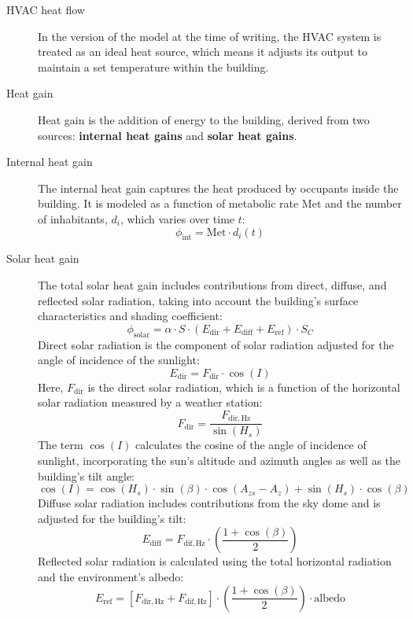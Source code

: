 \documentclass[runningheads]{llncs}
\begin{document}
\begin{description}
  \item[HVAC heat flow] In the version of the model at the time of writing, the HVAC system is treated as an ideal heat source, which means it adjusts its output to maintain a set temperature within the building.
  \item[Heat gain] Heat gain is the addition of energy to the building, derived from two sources: \textbf{internal heat gains} and \textbf{solar heat gains}.
  \item[Internal heat gain] The internal heat gain captures the heat produced by occupants inside the building. 
  It is modeled as a function of metabolic rate $\mathrm{Met}$ and the number of inhabitants, $d_i$, which varies over time $t$:
  \begin{equation}
    \phi_{\mathrm{int}} = \mathrm{Met} \cdot d_i(t)
  \end{equation}

\item[Solar heat gain] The total solar heat gain includes contributions from direct, diffuse, and reflected solar radiation, taking into account the building's surface characteristics and shading coefficient:
\begin{equation}
  \phi_{\mathrm{solar}} = \alpha \cdot S \cdot \left( E_{\mathrm{dir}} + E_{\mathrm{diff}} + E_{\mathrm{ref}} \right) \cdot S_C
\end{equation}
Direct solar radiation is the component of solar radiation adjusted for the angle of incidence of the sunlight:
\begin{equation}
  E_{\mathrm{dir}} = F_{\mathrm{dir}} \cdot \cos(I)
\end{equation}
Here, $F_{\mathrm{dir}}$ is the direct solar radiation, which is a function of the horizontal solar radiation measured by a weather station:
\begin{equation}
  F_{\mathrm{dir}} = \dfrac{F_{\mathrm{dir,Hz}}}{\sin(H_s)}
\end{equation}
The term $\cos(I)$ calculates the cosine of the angle of incidence of sunlight, incorporating the sun's altitude and azimuth angles as well as the building's tilt angle:
\begin{equation}
  \cos(I) = \cos(H_s) \cdot \sin(\beta) \cdot \cos(A_{zs} - A_z) + \sin(H_s) \cdot \cos(\beta)
\end{equation}
Diffuse solar radiation includes contributions from the sky dome and is adjusted for the building's tilt:
\begin{equation}
  E_{\mathrm{diff}} = F_{\mathrm{dif,Hz}} \cdot \left( \dfrac{1 + \cos(\beta)}{2} \right)
\end{equation}
Reflected solar radiation is calculated using the total horizontal radiation and the environment's albedo:
\begin{equation}
  E_{\mathrm{ref}} = \left[ F_{\mathrm{dir,Hz}} + F_{\mathrm{dif,Hz}} \right] \cdot \left( \dfrac{1 + \cos(\beta)}{2} \right) \cdot \text{albedo}
\end{equation}


\end{description}
\end{document}
